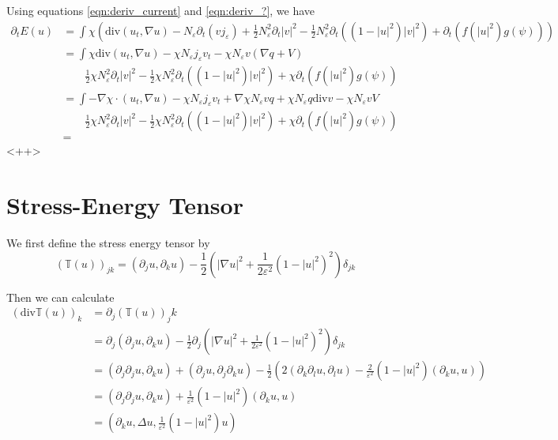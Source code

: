 \documentclass[a4paper]{article}
\renewcommand{\div}{\mathrm{div}}
\begin{document}
Using equations \eqref{eqn:deriv_current} and \eqref{eqn:deriv_?}, we have
\begin{align}
  \partial_t E(u) &= \int \chi \left( \div (u_t, \nabla u) - N_\varepsilon \partial_t(v j_\varepsilon) + \frac{1}{2} N_\varepsilon^2 \partial_t |v|^2
  - \frac{1}{2} N_\varepsilon^2 \partial_t \left( (1-|u|^2) |v|^2 \right) + \partial_t (f(|u|^2)g(\psi)) \right) \nonumber \\
  &= \int \chi \div(u_t,\nabla u) - \chi N_\varepsilon j_\varepsilon v_t - \chi N_\varepsilon v (\nabla q + V) \nonumber \\
  &\quad \quad \frac{1}{2} \chi N_\varepsilon^2 \partial_t |v|^2 - \frac{1}{2} \chi N_\varepsilon^2 \partial_t( (1-|u|^2)|v|^2) + \chi \partial_t(
  f(|u|^2) g(\psi)) \nonumber \\
  &= \int - \nabla \chi \cdot (u_t, \nabla u) - \chi N_\varepsilon j_\varepsilon v_t + \nabla \chi N_\varepsilon v q + \chi N_\varepsilon q \div v -
  \chi N_\varepsilon v V \nonumber \\
  &\quad \quad \frac{1}{2} \chi N_\varepsilon^2 \partial_t |v|^2 - \frac{1}{2} \chi N_\varepsilon^2 \partial_t( (1-|u|^2)|v|^2) + \chi \partial_t(
  f(|u|^2) g(\psi)) \nonumber \\
  &=
  \label{eqn:deriv_energy}
\end{align}<++>

\section{Stress-Energy Tensor}
We first define the stress energy tensor by
\begin{equation}
  (\mathbb{T}(u))_{jk} = (\partial_j u, \partial_k u) - \frac{1}{2} \left( |\nabla u|^2 + \frac{1}{2 \varepsilon^2} (1 - |u|^2)^2 \right) \delta_{jk}
  \label{eqn:stress_energy}
\end{equation}

Then we can calculate
\begin{align}
  (\div \mathbb{T}(u))_k &= \partial_j (\mathbb{T}(u))_jk \nonumber \\
  &= \partial_j (\partial_j u, \partial_k u) - \frac{1}{2} \partial_j \left( |\nabla u|^2 + \frac{1}{2 \varepsilon^2} ( 1 - |u|^2)^2 \right)
  \delta_{jk} \nonumber \\
  &= (\partial_j \partial_j u, \partial_k u) + (\partial_j u, \partial_j \partial_k u) - \frac{1}{2} \left( 2( \partial_k \partial_l u, \partial_l u)
  - \frac{2}{\varepsilon^2} (1- |u|^2) (\partial_k u, u) \right) \nonumber \\
  &= (\partial_j \partial_j u, \partial_k u) + \frac{1}{\varepsilon^2} (1-|u|^2) (\partial_k u, u) \nonumber \\
  &= ( \partial_k u, \Delta u, \frac{1}{\varepsilon^2} (1 - |u|^2)u)
  \label{eqn:div_stress_energy_comp}
\end{align}
\end{document}
